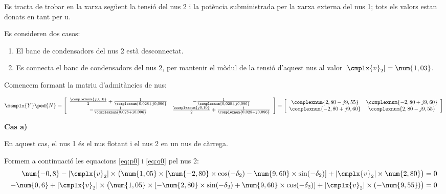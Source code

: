 \break
\begin{exemple}\label{ex:ControlTensCond}
	\addcontentsxms{\ControlTensCond}
    Es tracta de trobar en la xarxa següent la tensió del nus 2 i la
    potència subministrada per la xarxa externa del nus 1; tots els valors   estan donats en tant per u.

    Es consideren dos casos:
    \begin{enumerate}
       \renewcommand{\labelenumi}{\alph{enumi})}
       \item El banc de condensadors del nus 2 està desconnectat.
       \item Es connecta el banc de condensadors del nus 2, per  mantenir el mòdul de
       la tensió d'aquest nus al valor $|\cmplx{v}_2|=\num{1,03}$.
    \end{enumerate}

 	\begin{center}
		
	\end{center}

    Comencem formant la matriu d'admitàncies de nus:

    \[
    \mcmplx{Y}\ped{N} = 
    \begin{bmatrix}\begin{array}{cc} 
      \frac{\complexnum{j 0,10}}{2} + \frac{1}{\complexnum{0,028+j0,096}} & -\frac{1}{\complexnum{0,028+j0,096}} \\
      -\frac{1}{\complexnum{0,028+j0,096}} & \frac{\complexnum{j 0,10}}{2} + \frac{1}{\complexnum{0,028+j0,096}} \\
     \end{array}\end{bmatrix} =
    \begin{bmatrix}\begin{array}{cc} 
      \complexnum{2,80 -j9,55} & \complexnum{-2,80 +j9,60} \\
      \complexnum{-2,80 +j9,60} & \complexnum{2,80 -j9,55} \\
    \end{array}\end{bmatrix}
    \]

    \textbf{Cas a)}

     En aquest cas, el nus 1 és el nus flotant i el nus 2 en un nus
    de càrrega.

    Formem a continuació les equacions \eqref{eq:p0} i \eqref{eq:q0} pel
    nus 2:
    \begin{align*}
    \num{-0,8} - |\cmplx{v}_2| \times \bigl( \num{1,05}\times [\num{-2,80}\times \cos(-\delta_2) - \num{9,60} \times
    \sin( -\delta_2)]  + |\cmplx{v}_2| \times \num{2,80} \bigr) &= 0 \\
    -\num{0,6} + |\cmplx{v}_2| \times\bigl( \num{1,05} \times[-\num{2,80}\times\sin(-\delta_2) +
    \num{9,60}\times\cos( -\delta_2)]  + |\cmplx{v}_2|\times (-\num{9,55}) \bigr) &= 0
    \end{align*}


\end{exemple}
